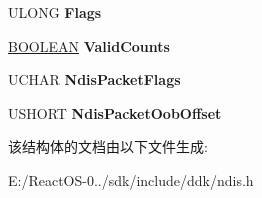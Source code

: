 \begin{DoxyCompactItemize}
U\+L\+O\+NG {\bfseries Flags}
\item 
\mbox{\label{struct___n_d_i_s___p_a_c_k_e_t___p_r_i_v_a_t_e_a96d100811c8d38805c00532fd05d31eb}} 
\hyperlink{_processor_bind_8h_a112e3146cb38b6ee95e64d85842e380a}{B\+O\+O\+L\+E\+AN} {\bfseries Valid\+Counts}
\item 
\mbox{\label{struct___n_d_i_s___p_a_c_k_e_t___p_r_i_v_a_t_e_a51e75b66829fd0652004211d08cd48a7}} 
U\+C\+H\+AR {\bfseries Ndis\+Packet\+Flags}
\item 
\mbox{\label{struct___n_d_i_s___p_a_c_k_e_t___p_r_i_v_a_t_e_adf621949d17ef7886bc8514f2b8089d8}} 
U\+S\+H\+O\+RT {\bfseries Ndis\+Packet\+Oob\+Offset}
\end{DoxyCompactItemize}


该结构体的文档由以下文件生成\+:\begin{DoxyCompactItemize}
\item 
E\+:/\+React\+O\+S-\/0../sdk/include/ddk/ndis.\+h\end{DoxyCompactItemize}
